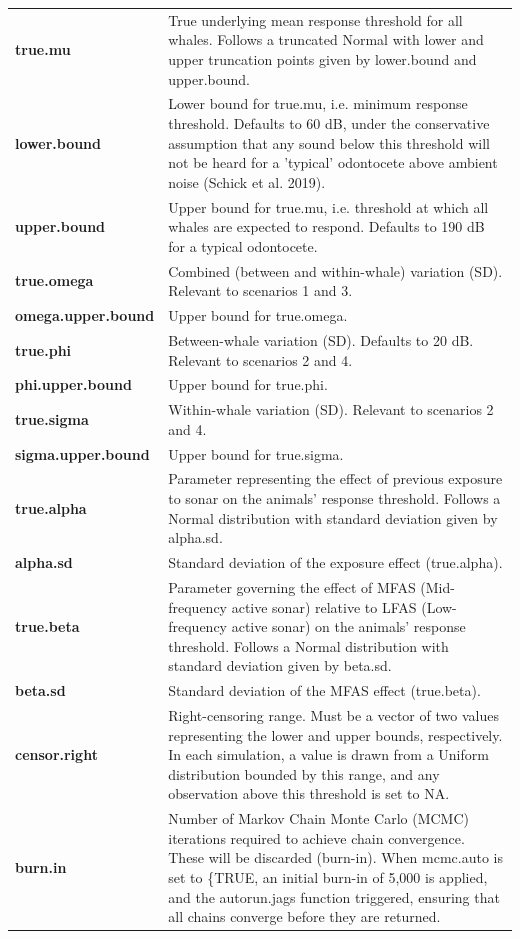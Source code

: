\documentclass[
]{article}
\begin{document}
\begin{longtable}{>{\bfseries}l|>{\raggedright\arraybackslash}p{30em}}
true.mu & True underlying mean response threshold for all whales. Follows a truncated Normal with lower and upper truncation points given by lower.bound and upper.bound.\\
\addlinespace
lower.bound & Lower bound for true.mu, i.e. minimum response threshold. Defaults to 60 dB, under the conservative assumption that any sound below this threshold will not be heard for a 'typical' odontocete above ambient noise (Schick et al. 2019).\\
upper.bound & Upper bound for true.mu, i.e. threshold at which all whales are expected to respond. Defaults to 190 dB for a typical odontocete.\\
true.omega & Combined (between and within-whale) variation (SD). Relevant to scenarios 1 and 3.\\
omega.upper.bound & Upper bound for true.omega.\\
true.phi & Between-whale variation (SD). Defaults to 20 dB. Relevant to scenarios 2 and 4.\\
\addlinespace
phi.upper.bound & Upper bound for true.phi.\\
true.sigma & Within-whale variation (SD). Relevant to scenarios 2 and 4.\\
sigma.upper.bound & Upper bound for true.sigma.\\
true.alpha & Parameter representing the effect of previous exposure to sonar on the animals' response threshold. Follows a Normal distribution with standard deviation given by alpha.sd.\\
alpha.sd & Standard deviation of the exposure effect (true.alpha).\\
\addlinespace
true.beta & Parameter governing the effect of MFAS (Mid-frequency active sonar) relative to LFAS (Low-frequency active sonar) on the animals' response threshold. Follows a Normal distribution with standard deviation given by beta.sd.\\
beta.sd & Standard deviation of the MFAS effect (true.beta).\\
censor.right & Right-censoring range. Must be a vector of two values representing the lower and upper bounds, respectively. In each simulation, a value is drawn from a Uniform distribution bounded by this range, and any observation above this threshold is set to NA.\\
burn.in & Number of Markov Chain Monte Carlo (MCMC) iterations required to achieve chain convergence. These will be discarded (burn-in). When mcmc.auto is set to \{TRUE, an initial burn-in of 5,000 is applied, and the autorun.jags function triggered, ensuring that all chains converge before they are returned.\\

\end{longtable}
\end{document}
